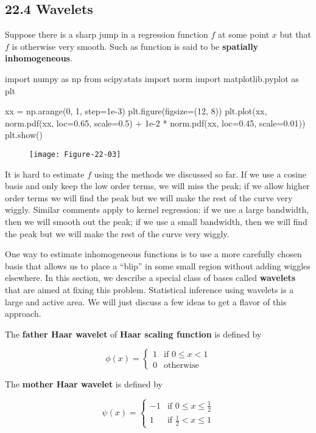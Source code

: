 \subsection*{22.4 Wavelets}\label{wavelets}

Suppose there is a sharp jump in a regression function \(f\) at some
point \(x\) but that \(f\) is otherwise very smooth. Such as function is
said to be \textbf{spatially inhomogeneous}.

\begin{python}
import numpy as np
from scipy.stats import norm
import matplotlib.pyplot as plt

xx = np.arange(0, 1, step=1e-3)
plt.figure(figsize=(12, 8))
plt.plot(xx, norm.pdf(xx, loc=0.65, scale=0.5) + 1e-2 * norm.pdf(xx, loc=0.45, scale=0.01))
plt.show()
\end{python}

\begin{figure}[H]
\centering
\texttt{[image: Figure-22-03]}
\end{figure}

It is hard to estimate \(f\) using the methods we discussed so far. If we
use a cosine basis and only keep the low order terms, we will miss the
peak; if we allow higher order terms we will find the peak but we will
make the rest of the curve very wiggly. Similar comments apply to kernel
regression: if we use a large bandwidth, then we will smooth out the
peak; if we use a small bandwidth, then we will find the peak but we
will make the rest of the curve very wiggly.

One way to estimate inhomogeneous functions is to use a more carefully
chosen basis that allows us to place a ``blip'' in some small region
without adding wiggles elsewhere. In this section, we describe a special
class of bases called \textbf{wavelets} that are aimed at fixing this
problem. Statistical inference using wavelets is a large and active
area. We will just discuss a few ideas to get a flavor of this approach.

The \textbf{father Haar wavelet} of \textbf{Haar scaling function} is
defined by

\[ \phi(x) = \begin{cases}
1 & \text{if } 0 \leq x < 1 \\
0 & \text{otherwise}
\end{cases} \]

The \textbf{mother Haar wavelet} is defined by

\[
\psi(x) = \begin{cases}
-1 & \text{if } 0 \leq x \leq \frac{1}{2} \\
1  & \text{if } \frac{1}{2} < x \leq 1
\end{cases}
\]

